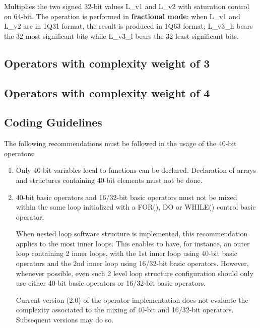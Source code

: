 
Multiplies the two signed 32-bit values L\_v1 and L\_v2 with saturation control on 64-bit.
The operation is performed in \textbf{fractional mode}: when L\_v1 and L\_v2 are in 1Q31 format, the result is produced in 1Q63 format; L\_v3\_h bears the 32 most significant bits while L\_v3\_l bears the 32 least significant bits.

\subsection{Operators with complexity weight of 3}


\subsection{Operators with complexity weight of 4}



\subsection{Coding Guidelines}

The following recommendations must be followed in the usage of the
40-bit operators:
\begin{enumerate}
\item Only 40-bit variables local to functions can be declared.
Declaration of arrays and structures containing 40-bit elements
must not be done.
\item 40-bit basic operators and 16/32-bit basic
operators must not be mixed within the same loop initialized with
a FOR(), DO or WHILE() control basic operator.

When nested loop software structure is implemented, this
recommendation applies to the most inner loops. This enables to
have, for instance, an outer loop containing 2 inner loops, with
the 1st inner loop using 40-bit basic operators and the 2nd inner
loop using 16/32-bit basic operators. However, whenever possible,
even such 2 level loop structure configuration should only use
either 40-bit basic operators or 16/32-bit basic operators.

Current version (2.0) of the operator implementation does not
evaluate the complexity associated to the mixing of 40-bit and
16/32-bit operators. Subsequent versions may do so.
\end{enumerate}

